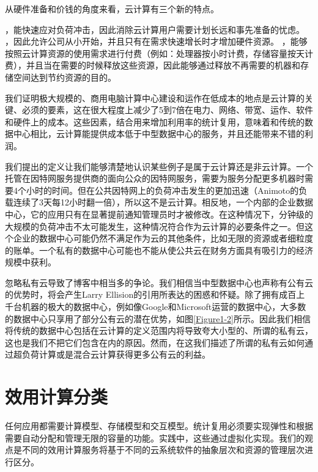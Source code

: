 
从硬件准备和价钱的角度来看，云计算有三个新的特点。
\begin{itemize}
，能快速应对负荷冲击，因此消除云计算用户需要计划长远和事先准备的忧虑。
，因此允许公司从小开始，并且只有在需求快速增长时才增加硬件资源。
，能够按照云计算资源的使用需求进行付费（例如：处理器按小时计费，存储容量按天计费），并且当在需要的时候释放这些资源，因此能够通过释放不再需要的机器和存储空间达到节约资源的目的。
\end{itemize}

我们证明极大规模的、商用电脑计算中心建设和运作在低成本的地点是云计算的关键、必须的要素，这在很大程度上减少了5到7倍在电力、网络、带宽、运作、软件和硬件上的成本。这些因素，结合用来增加利用率的统计复用，意味着和传统的数据中心相比，云计算能提供成本低于中型数据中心的服务，并且还能带来不错的利润。

我们提出的定义让我们能够清楚地认识某些例子是属于云计算还是非云计算。一个托管在因特网服务提供商的面向公众的因特网服务，需要为服务分配更多机器时需要4个小时的时间。但在公共因特网上的负荷冲击发生的更加迅速（Animoto的负载连续了3天每12小时翻一倍），所以这不是云计算。相反地，一个内部的企业数据中心，它的应用只有在显著提前通知管理员时才被修改。在这种情况下，分钟级的大规模的负荷冲击不太可能发生，这种情况符合作为云计算的必要条件之一。但这个企业的数据中心可能仍然不满足作为云的其他条件，比如无限的资源或者细粒度的账单。一个私有的数据中心可能也不能从使公共云在财务方面具有吸引力的经济规模中获利。

忽略私有云导致了博客中相当多的争论。我们相信当中型数据中心也声称有公有云的优势时，将会产生Larry Ellision的引用所表达的困惑和怀疑。除了拥有成百上千台机器的极大的数据中心，例如像Google和Microsoft运营的数据中心，大多数的数据中心只享用了部分公有云的潜在优势，如图\ref{Figure1-2}所示。因此我们相信将传统的数据中心包括在云计算的定义范围内将导致夸大小型的、所谓的私有云，这也是我们不把它们包含在内的原因。然而，在这我们描述了所谓的私有云如何通过超负荷计算或是混合云计算获得更多公有云的利益。


\section{效用计算分类}

任何应用都需要计算模型、存储模型和交互模型。统计复用必须要实现弹性和根据需要自动分配和管理无限的容量的功能。实践中，这些通过虚拟化实现。我们的观点是不同的效用计算服务将基于不同的云系统软件的抽象层次和资源的管理层次进行区分。

